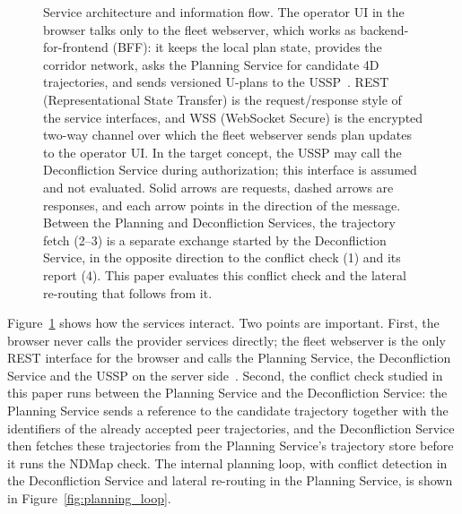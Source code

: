 \begin{figure}[!htbp]
{%
  }
  \caption{Service architecture and information flow. The operator UI in the browser talks only to the fleet webserver, which works as backend-for-frontend (BFF): it keeps the local plan state, provides the corridor network, asks the Planning Service for candidate 4D trajectories, and sends versioned U-plans to the USSP~\cite{nagel2026microservice}. REST (Representational State Transfer) is the request/response style of the service interfaces, and WSS (WebSocket Secure) is the encrypted two-way channel over which the fleet webserver sends plan updates to the operator UI. In the target concept, the USSP may call the Deconfliction Service during authorization; this interface is assumed and not evaluated. Solid arrows are requests, dashed arrows are responses, and each arrow points in the direction of the message. Between the Planning and Deconfliction Services, the trajectory fetch (2--3) is a separate exchange started by the Deconfliction Service, in the opposite direction to the conflict check (1) and its report (4). This paper evaluates this conflict check and the lateral re-routing that follows from it.}
  \label{fig:architecture}
\end{figure}

Figure~\ref{fig:architecture} shows how the services interact. Two points are important. First, the browser never calls the provider services directly; the fleet webserver is the only REST interface for the browser and calls the Planning Service, the Deconfliction Service and the USSP on the server side~\cite{nagel2026microservice}. Second, the conflict check studied in this paper runs between the Planning Service and the Deconfliction Service: the Planning Service sends a reference to the candidate trajectory together with the identifiers of the already accepted peer trajectories, and the Deconfliction Service then fetches these trajectories from the Planning Service's trajectory store before it runs the NDMap check. The internal planning loop, with conflict detection in the Deconfliction Service and lateral re-routing in the Planning Service, is shown in Figure~\ref{fig:planning_loop}.

